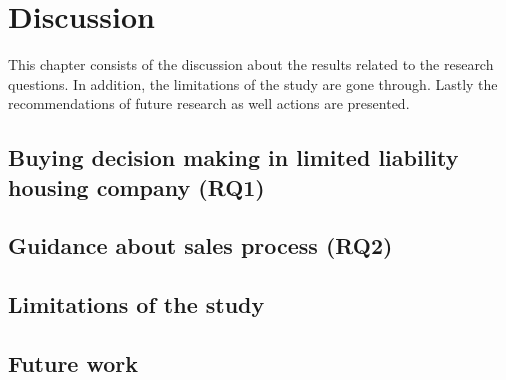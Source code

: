 \chapter{Discussion}
\label{chapter:discussion}

This chapter consists of the discussion about the results related to the research questions. In addition, the limitations of the study are gone through. Lastly the recommendations of future research as well actions are presented.

\section{Buying decision making in limited liability housing company (RQ1)}




\section{Guidance about sales process (RQ2)}

\section{Limitations of the study}

\section{Future work}